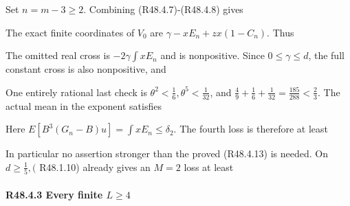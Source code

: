 
Set \(n=m-3\ge 2\). Combining (R48.4.7)-(R48.4.8) gives


The exact finite coordinates of \(V_0\) are \(\gamma-x E_n+z x(1-C_n)\). Thus


The omitted real cross is \(-2 \gamma \int  x E_n\) and is nonpositive. Since \(0\le \gamma\le d\), the full constant cross is also nonpositive, and


One entirely rational last check is \(\theta^2<\frac{1}{6},\allowbreak \allowbreak  \theta^5<\frac{1}{32}\), and \(\frac{4}{9}+\frac{1}{6}+\frac{1}{32}=\frac{185}{288}<\frac{2}{3}\). The actual mean in the exponent satisfies


Here \(E[B^3(G_n-B)u]=\int  x E_n\le \delta_2\). The fourth loss is therefore at least


In particular no assertion stronger than the proved (R48.4.13) is needed. On \(d\ge \frac{1}{5},\allowbreak \allowbreak  (\) R48.1.10) already gives an \(M=2\) loss at least


\paragraph{R48.4.3 Every finite \(L\ge 4\)}

